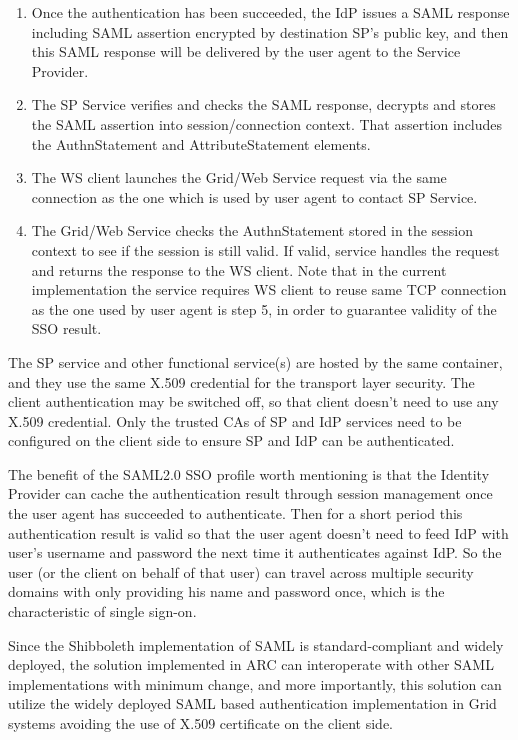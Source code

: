 \documentclass[twocolumn]{svjour3}         %
\begin{document}
\begin{enumerate}
\item Once the authentication has been succeeded, the IdP issues a SAML response including SAML assertion encrypted by destination SP’s public key, and then this SAML response will be delivered by the user agent to the Service Provider.
\item The SP Service verifies and checks the SAML response, decrypts and stores the SAML assertion into session/connection context. That assertion includes the AuthnStatement and AttributeStatement elements.
\item The WS client launches the Grid/Web Service request via the same connection as the one which is used by user agent to contact SP Service.
\item The Grid/Web Service checks the AuthnStatement stored in the session context to see if the session is still valid. If valid, service handles the  request and returns the response to the WS client. Note that in the current implementation the service requires WS client to reuse same TCP connection as the one used by user agent is step 5, in order to guarantee  validity of the SSO result.
\end{enumerate}
The SP service and other functional service(s) are hosted by the same container, and they use the same X.509 credential for the transport layer security. The client authentication may be switched off, so that client doesn't need to use any X.509 credential. Only the trusted CAs of SP and IdP services need to be configured on the client side to ensure SP and IdP can be authenticated.

The benefit of the SAML2.0 SSO profile worth mentioning is that the Identity Provider can cache the authentication result through session management once the user agent has succeeded to authenticate. Then for a short period this authentication result is valid so that the user agent doesn't need to feed IdP with user's username and password the next time it authenticates against IdP. So the user (or the client on behalf of that user) can travel across multiple security domains with only providing his name and password once, which is the characteristic of single sign-on.

Since the Shibboleth implementation of SAML is standard-compliant and widely deployed, the solution implemented in ARC can interoperate with other SAML implementations with minimum change, and more importantly, this solution can utilize the widely deployed SAML based authentication implementation in Grid systems avoiding the use of X.509 certificate on the client side.
\end{document}
